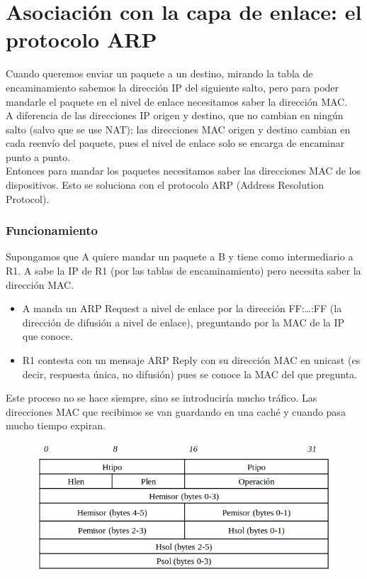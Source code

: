 \section{Asociación con la capa de enlace: el protocolo ARP}
Cuando queremos enviar un paquete a un destino, mirando la tabla de encaminamiento sabemos la dirección IP del siguiente salto, pero para poder mandarle el paquete en el nivel de enlace necesitamos saber la dirección MAC. \\

A diferencia de las direcciones IP origen y destino, que no cambian en ningún salto (salvo que se use NAT); las direcciones MAC origen y destino cambian en cada reenvío del paquete, pues el nivel de enlace solo se encarga de encaminar punto a punto.\\

Entonces para mandar los paquetes necesitamos saber las direcciones MAC de los dispositivos. Esto se soluciona con el protocolo ARP (Address Resolution Protocol). 

\subsubsection{Funcionamiento}
Supongamos que A quiere mandar un paquete a B y tiene como intermediario a R1. A sabe la IP de R1 (por las tablas de encaminamiento) pero necesita saber la dirección MAC. 
\begin{itemize}
    \item A manda un ARP Request a nivel de enlace por la dirección FF:\ldots:FF (la dirección de difusión a nivel de enlace), preguntando por la MAC de la IP que conoce. 
    \item R1 contesta con un mensaje ARP Reply con su dirección MAC en unicast (es decir, respuesta única, no difusión) pues se conoce la MAC del que pregunta.
\end{itemize}

Este proceso no se hace siempre, sino se introduciría mucho tráfico. Las direcciones MAC que recibimos se van guardando en una caché y cuando pasa mucho tiempo expiran.\\

\begin{figure}[H]
    \centering
    \includegraphics[width=0.6\linewidth]{./images/cabecera-arp.png}
\end{figure}



